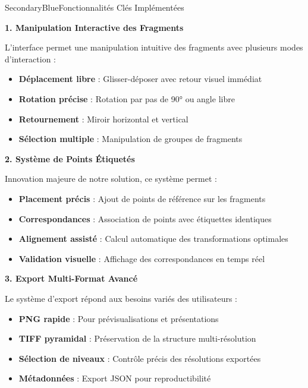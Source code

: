 \documentclass[11pt,a4paper]{article}
\begin{document}
\begin{subsectionbox}{SecondaryBlue}{Fonctionnalités Clés Implémentées}

\textbf{1. Manipulation Interactive des Fragments}

L'interface permet une manipulation intuitive des fragments avec plusieurs modes d'interaction :

\begin{itemize}[leftmargin=*]
    \item \textbf{Déplacement libre} : Glisser-déposer avec retour visuel immédiat
    \item \textbf{Rotation précise} : Rotation par pas de 90° ou angle libre
    \item \textbf{Retournement} : Miroir horizontal et vertical
    \item \textbf{Sélection multiple} : Manipulation de groupes de fragments
\end{itemize}

\textbf{2. Système de Points Étiquetés}

Innovation majeure de notre solution, ce système permet :

\begin{itemize}[leftmargin=*]
    \item \textbf{Placement précis} : Ajout de points de référence sur les fragments
    \item \textbf{Correspondances} : Association de points avec étiquettes identiques
    \item \textbf{Alignement assisté} : Calcul automatique des transformations optimales
    \item \textbf{Validation visuelle} : Affichage des correspondances en temps réel
\end{itemize}

\textbf{3. Export Multi-Format Avancé}

Le système d'export répond aux besoins variés des utilisateurs :

\begin{itemize}[leftmargin=*]
    \item \textbf{PNG rapide} : Pour prévisualisations et présentations
    \item \textbf{TIFF pyramidal} : Préservation de la structure multi-résolution
    \item \textbf{Sélection de niveaux} : Contrôle précis des résolutions exportées
    \item \textbf{Métadonnées} : Export JSON pour reproductibilité
\end{itemize}

\end{subsectionbox}
\end{document}
